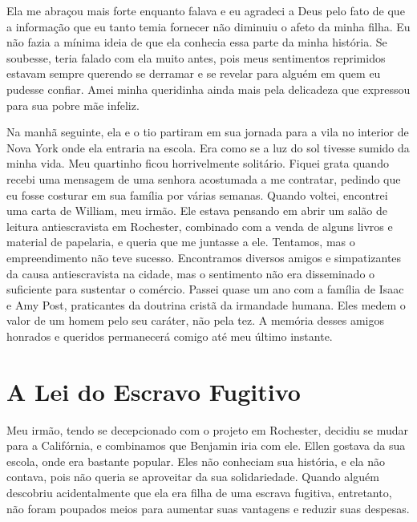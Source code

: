 Ela me abraçou mais forte enquanto falava e eu agradeci a Deus pelo fato
de que a informação que eu tanto temia fornecer não diminuiu o afeto da
minha filha. Eu não fazia a mínima ideia de que ela conhecia essa parte
da minha história. Se soubesse, teria falado com ela muito antes, pois
meus sentimentos reprimidos estavam sempre querendo se derramar e se
revelar para alguém em quem eu pudesse confiar. Amei minha queridinha
ainda mais pela delicadeza que expressou para sua pobre mãe infeliz.

Na manhã seguinte, ela e o tio partiram
em sua jornada para a vila no interior de Nova York onde ela entraria na
escola. Era como se a luz do sol tivesse sumido da minha vida. Meu
quartinho ficou horrivelmente solitário. Fiquei grata quando recebi uma
mensagem de uma senhora acostumada a me contratar, pedindo que eu fosse
costurar em sua família por várias semanas. Quando voltei, encontrei uma
carta de William, meu irmão. Ele estava pensando em abrir um salão de
leitura antiescravista em Rochester, combinado com a venda de alguns
livros e material de papelaria, e queria que me juntasse a ele.
Tentamos, mas o empreendimento não teve sucesso. Encontramos diversos
amigos e simpatizantes da causa antiescravista na cidade, mas o
sentimento não era disseminado o suficiente para sustentar o comércio.
Passei quase um ano com a família de Isaac e Amy Post, praticantes da
doutrina cristã da irmandade humana. Eles medem o valor de um homem pelo
seu caráter, não pela tez. A memória desses amigos honrados e queridos
permanecerá comigo até meu último instante.

\chapter*{A Lei do Escravo Fugitivo}

Meu irmão, tendo se decepcionado com o
projeto em Rochester, decidiu se mudar para a Califórnia, e combinamos
que Benjamin iria com ele. Ellen gostava da sua escola, onde era
bastante popular. Eles não conheciam sua história, e ela não contava,
pois não queria se aproveitar da sua solidariedade. Quando alguém
descobriu acidentalmente que ela era filha de uma escrava fugitiva,
entretanto, não foram poupados meios para aumentar suas vantagens e
reduzir suas despesas.

